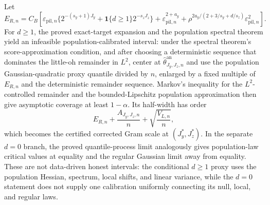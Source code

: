 Let
\[
E_{R,n}=C_B\left[
\varepsilon_{\mathrm{pil},n}\{2^{-(s_y+1)J_y}+\mathbf 1\{d\ge1\}2^{-s_zJ_z}\}
+\varepsilon_{\mathrm{pil},n}^{2+a_y}
+\rho^{2a_y/(2+3/s_y+d/s_z)}\varepsilon_{\mathrm{pil},n}^2
\right].
\]
For \(d\ge1\), the proved exact-target expansion and the population spectral theorem yield an infeasible population-calibrated interval: under the spectral theorem's score-approximation condition, and after choosing a deterministic sequence that dominates the little-oh remainder in \(L^2\), center at \(\widehat\theta^{\mathrm{an}}_{J_y,J_z,n}\) and use the population Gaussian-quadratic proxy quantile divided by \(n\), enlarged by a fixed multiple of \(E_{R,n}\) and the deterministic remainder sequence. Markov's inequality for the \(L^2\)-controlled remainder and the bounded-Lipschitz population approximation then give asymptotic coverage at least \(1-\alpha\). Its half-width has order
\[
E_{R,n}+\frac{A_{J_y,J_z,n}}n+\sqrt{\frac{V_{L,n}}n},
\]
which becomes the certified corrected Gram scale at \((J_y^*,J_z^*)\). In the separate \(d=0\) branch, the proved quantile-process limit analogously gives population-law critical values at equality and the regular Gaussian limit away from equality. These are not data-driven honest intervals: the conditional \(d\ge1\) proxy uses the population Hessian, spectrum, local shifts, and linear variance, while the \(d=0\) statement does not supply one calibration uniformly connecting its null, local, and regular laws.